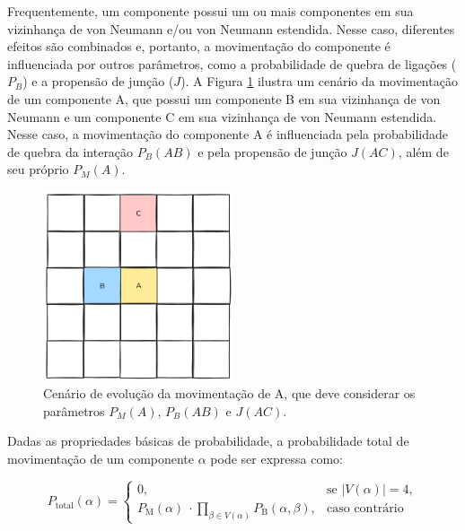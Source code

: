 \documentclass[12pt,oneside]{report}
\begin{document}
Frequentemente, um componente possui um ou mais componentes em sua vizinhança de von Neumann e/ou von Neumann estendida. Nesse caso, diferentes efeitos são combinados e, portanto, a movimentação do componente é influenciada por outros parâmetros, como a probabilidade de quebra de ligações (\hyperref[subsubsec:Pb]{$P_B$}) e a propensão de junção (\hyperref[subsubsec:J]{$J$}). A Figura \ref{fig:evolucao_Pm_Pb_J} ilustra um cenário da movimentação de um componente A, que possui um componente B em sua vizinhança de von Neumann e um componente C em sua vizinhança de von Neumann estendida. Nesse caso, a movimentação do componente A é influenciada pela probabilidade de quebra da interação $P_B (AB)$ e pela propensão de junção $J(AC)$, além de seu próprio $P_M (A)$.

\begin{figure}[H]
    \centering
    \includegraphics[width=0.5\textwidth]{img/evolucao_Pm_Pb_J.png}
    \caption{\small Cenário de evolução da movimentação de A, que deve considerar os parâmetros $P_M (A)$, $P_B (AB)$ e $J(AC)$.}
    \label{fig:evolucao_Pm_Pb_J}
\end{figure}

Dadas as propriedades básicas de probabilidade, a probabilidade total de movimentação de um componente $\alpha$ pode ser expressa como:

\begin{equation}
    \label{eq:pmov_total}
    P_\text{total}(\alpha) =
    \begin{cases}
        0,                                                                                            & \text{se } \left| V(\alpha) \right| = 4, \\[2ex]
        P_\text{M}(\alpha)\ \cdot \displaystyle\prod_{\beta \in V(\alpha)} P_\text{B}(\alpha, \beta), & \text{caso contrário}
    \end{cases}
\end{equation}
\end{document}
